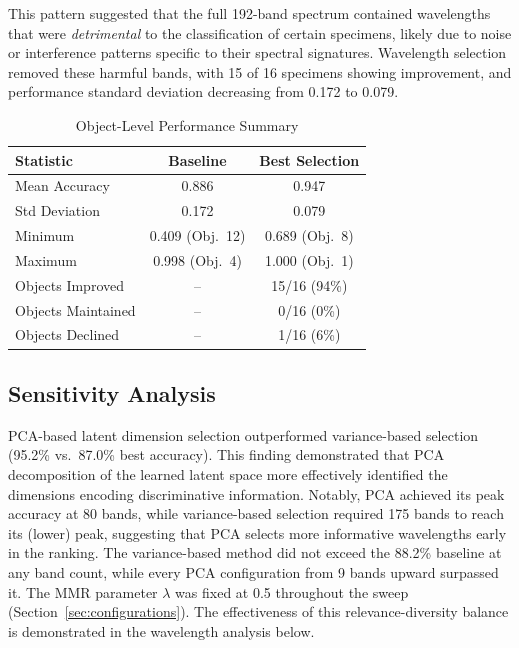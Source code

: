 This pattern suggested that the full 192-band spectrum contained wavelengths that were \emph{detrimental} to the classification of certain specimens, likely due to noise or interference patterns specific to their spectral signatures.
Wavelength selection removed these harmful bands, with 15 of 16 specimens showing improvement, and performance standard deviation decreasing from 0.172 to 0.079.


\begin{table}[!t]
\centering
\caption{Object-Level Performance Summary}
\label{tab:objects}
\begin{tabular}{@{}lcc@{}}
\toprule
\textbf{Statistic} & \textbf{Baseline} & \textbf{Best Selection} \\
\midrule
Mean Accuracy & 0.886 & 0.947 \\
Std Deviation & 0.172 & 0.079 \\
Minimum & 0.409 (Obj.\ 12) & 0.689 (Obj.\ 8) \\
Maximum & 0.998 (Obj.\ 4) & 1.000 (Obj.\ 1) \\
\midrule
Objects Improved & -- & 15/16 (94\%) \\
Objects Maintained & -- & 0/16 (0\%) \\
Objects Declined & -- & 1/16 (6\%) \\
\bottomrule
\end{tabular}
\end{table}


\subsection{Sensitivity Analysis}
\label{sec:results_params}


PCA-based latent dimension selection outperformed variance-based selection (95.2\% vs.\ 87.0\% best accuracy).
This finding demonstrated that PCA decomposition of the learned latent space more effectively identified the dimensions encoding discriminative information.
Notably, PCA achieved its peak accuracy at 80 bands, while variance-based selection required 175 bands to reach its (lower) peak, suggesting that PCA selects more informative wavelengths early in the ranking.
The variance-based method did not exceed the 88.2\% baseline at any band count, while every PCA configuration from 9 bands upward surpassed it.
The MMR parameter $\lambda$ was fixed at 0.5 throughout the sweep (Section~\ref{sec:configurations}).
The effectiveness of this relevance-diversity balance is demonstrated in the wavelength analysis below.

